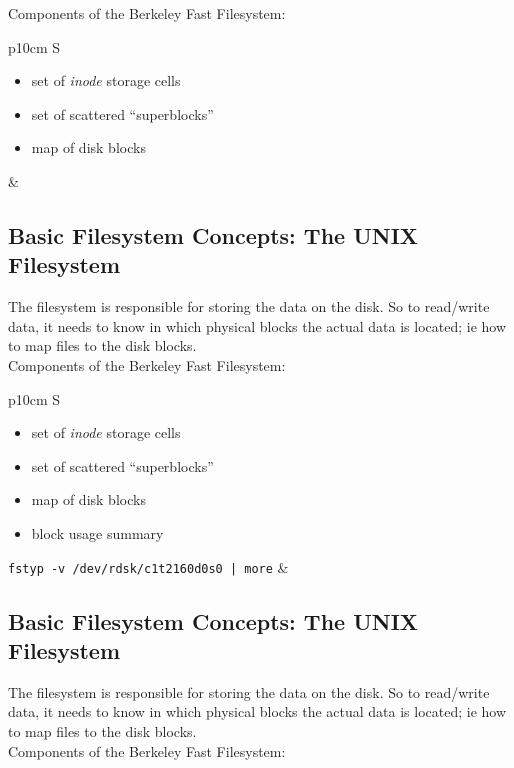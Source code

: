 \documentclass[xga]{xdvislides}
\begin{document}
Components of the Berkeley Fast Filesystem:
\\

\begin{tabular}{ p{10cm} S }
\begin{itemize}
	\item set of {\em inode} storage cells
	\item set of scattered ``superblocks''
	\item map of disk blocks
\end{itemize}
&  \\
\end{tabular}

\subsection{Basic Filesystem Concepts: The UNIX Filesystem}
The filesystem is responsible for storing the data on the disk.
So to read/write data, it needs to know in which physical blocks the actual
data is located; ie how to map files to the disk blocks.
\\

Components of the Berkeley Fast Filesystem:
\\

\begin{tabular}{ p{10cm} S }
\begin{itemize}
	\item set of {\em inode} storage cells
	\item set of scattered ``superblocks''
	\item map of disk blocks
	\item block usage summary
\end{itemize}
{\tt fstyp -v /dev/rdsk/c1t2160d0s0  | more}
&  \\
\end{tabular}

\subsection{Basic Filesystem Concepts: The UNIX Filesystem}
The filesystem is responsible for storing the data on the disk.
So to read/write data, it needs to know in which physical blocks the actual
data is located; ie how to map files to the disk blocks.
\\

Components of the Berkeley Fast Filesystem:
\\
\end{document}
